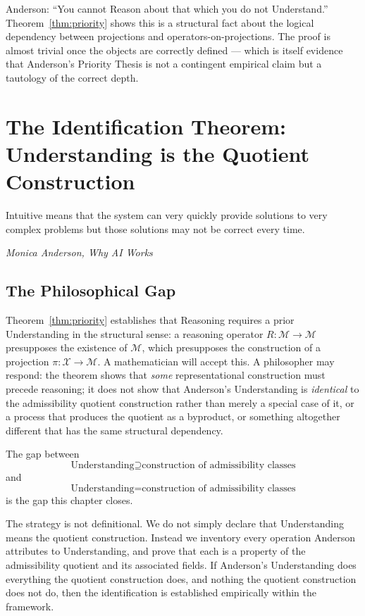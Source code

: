 \documentclass[12pt, a4paper, oneside]{book}
\newcommand{\X}{\mathcal{X}}
\newcommand{\M}{\mathcal{M}}
\newcommand{\proj}{\pi}
\begin{document}
\begin{remark}
Anderson: ``You cannot Reason about that which you do not Understand.''
Theorem~\ref{thm:priority} shows this is a structural fact about the
logical dependency between projections and operators-on-projections.
The proof is almost trivial once the objects are correctly defined ---
which is itself evidence that Anderson's Priority Thesis is not a
contingent empirical claim but a tautology of the correct depth.
\end{remark}

\chapter{The Identification Theorem: Understanding is the Quotient Construction}
\label{ch:identification}

\epigraph{%
  Intuitive means that the system can very quickly provide solutions
  to very complex problems but those solutions may not be correct every time.%
}{\textit{Monica Anderson, \emph{Why AI Works}}}

\section{The Philosophical Gap}

Theorem~\ref{thm:priority} establishes that Reasoning requires a prior
Understanding in the structural sense: a reasoning operator $R : \M \to \M$
presupposes the existence of $\M$, which presupposes the construction of
a projection $\proj : \X \to \M$.
A mathematician will accept this.
A philosopher may respond: the theorem shows that \emph{some}
representational construction must precede reasoning; it does not show
that Anderson's Understanding is \emph{identical} to the admissibility
quotient construction rather than merely a special case of it, or a
process that produces the quotient as a byproduct, or something
altogether different that has the same structural dependency.

The gap between
\[
  \text{Understanding} \supseteq \text{construction of admissibility classes}
\]
and
\[
  \text{Understanding} = \text{construction of admissibility classes}
\]
is the gap this chapter closes.

The strategy is not definitional. We do not simply declare that
Understanding means the quotient construction. Instead we inventory
every operation Anderson attributes to Understanding, and prove that
each is a property of the admissibility quotient and its associated
fields. If Anderson's Understanding does everything the quotient
construction does, and nothing the quotient construction does not do,
then the identification is established empirically within the framework.
\end{document}
